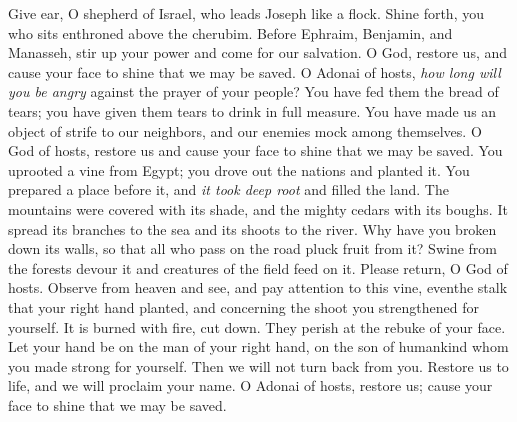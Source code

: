 \begin{biblechapter} %
 Give ear, O shepherd of Israel, 
who leads Joseph like a flock. 
Shine forth, you who sits enthroned above the cherubim.
\verse Before Ephraim, Benjamin, and Manasseh, 
stir up your power 
and come for our salvation.
\verse O God, restore us, 
and cause your face to shine that we may be saved.
\verse O Adonai of hosts, 
\textit{how long will you be angry} 
against the prayer of your people?
\verse You have fed them the bread of tears; 
you have given them tears to drink in full measure.
\verse You have made us an object of strife to our neighbors, 
and our enemies mock among themselves.
\verse O God of hosts, restore us 
and cause your face to shine that we may be saved.
\verse You uprooted a vine from Egypt; 
you drove out the nations and planted it.
\verse You prepared a place before it, 
and \textit{it took deep root} and filled the land.
\verse The mountains were covered with its shade, 
and the mighty cedars with its boughs.
\verse It spread its branches to the sea 
and its shoots to the river.
\verse Why have you broken down its walls, 
so that all who pass on the road pluck fruit from it?
\verse Swine from the forests devour it 
and creatures of the field feed on it.
\verse Please return, O God of hosts. 
Observe from heaven and see, 
and pay attention to this vine,
\verse eventhe stalk that your right hand planted, 
and concerning the shoot you strengthened for yourself.
\verse It is burned with fire, cut down. 
They perish at the rebuke of your face.
\verse Let your hand be on the man of your right hand, 
on the son of humankind whom you made strong for yourself.
\verse Then we will not turn back from you. 
Restore us to life, and we will proclaim your name.
\verse O Adonai of hosts, restore us; 
cause your face to shine that we may be saved.
\end{biblechapter}

